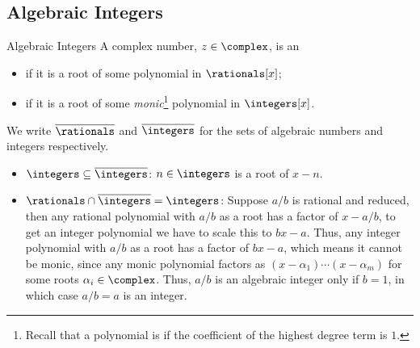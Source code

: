 \subsection{Algebraic Integers}
\begin{dfn}{Algebraic Integers}{}
    A complex number, \(z \in \complex\), is an
    \begin{itemize}
        \item {} if it is a root of some polynomial in \(\rationals[x]\);
        \item {} if it  is a root of some \emph{monic}\footnote{Recall that a polynomial is  if the coefficient of the highest degree term is \(1\).} polynomial in \(\integers[x]\).
    \end{itemize}
    We write \(\algNumbers\) and \(\algIntegers\) for the sets of algebraic numbers and integers respectively.
\end{dfn}

\begin{exm}{}{}
    \begin{itemize}
        \item \(\integers \subseteq \algIntegers\): \(n \in \integers\) is a root of \(x - n\).
        \item \(\rationals \cap \algIntegers = \integers\): Suppose \(a/b\) is rational and reduced, then any rational polynomial with \(a/b\) as a root has a factor of \(x - a/b\), to get an integer polynomial we have to scale this to \(bx - a\).
        Thus, any integer polynomial with \(a/b\) as a root has a factor of \(b x - a\), which means it cannot be monic, since any monic polynomial factors as \((x - \alpha_1) \dotsm (x - \alpha_m)\) for some roots \(\alpha_i \in \complex\).
        Thus, \(a/b\) is an algebraic integer only if \(b = 1\), in which case \(a/b = a\) is an integer.
    \end{itemize}
\end{exm}


